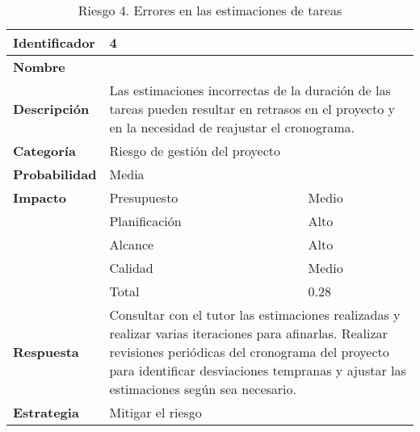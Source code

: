 \begin{table}[H]
    \centering
    \caption{Riesgo 4. Errores en las estimaciones de tareas}
    \label{table:risk_estimaciones}
    \begin{tabular}{>{\columncolor{lightgreen!20}}l l l}
    \toprule
    \rowcolor{lightgreen}
    \textbf{Identificador} & \multicolumn{2}{l}{4} \\
    \midrule
    \textbf{Nombre} & \multicolumn{2}{l}{} \\
    \midrule
    \textbf{Descripción} & \multicolumn{2}{p{10cm}}{Las estimaciones incorrectas de la duración de las tareas pueden resultar en retrasos en el proyecto y en la necesidad de reajustar el cronograma.} \\
    \midrule
    \textbf{Categoría} & \multicolumn{2}{l}{Riesgo de gestión del proyecto} \\
    \midrule
    \textbf{Probabilidad} & \multicolumn{2}{l}{Media} \\
    \midrule
    \textbf{Impacto} & Presupuesto & Medio \\
    \cmidrule(lr){2-3}
    & Planificación & Alto \\
    \cmidrule(lr){2-3}
    & Alcance & Alto \\
    \cmidrule(lr){2-3}
    & Calidad & Medio \\
    \cmidrule(lr){2-3}
    & Total & 0.28 \\
    \midrule
    \textbf{Respuesta} & \multicolumn{2}{p{10cm}}{Consultar con el tutor las estimaciones realizadas y realizar varias iteraciones para afinarlas. Realizar revisiones periódicas del cronograma del proyecto para identificar desviaciones tempranas y ajustar las estimaciones según sea necesario.} \\
    \midrule
    \textbf{Estrategia} & \multicolumn{2}{l}{Mitigar el riesgo} \\
    \bottomrule
    \end{tabular}
\end{table}

